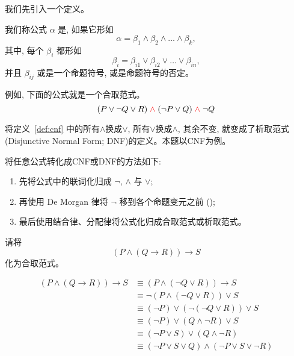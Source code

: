 \documentclass[a4paper, justified]{tufte-handout}
\begin{document}
\begin{problem}
  我们先引入一个定义。

  \begin{definition}
    \label{def:cnf}
    我们称公式 $\alpha$ 是, 如果它形如
    \[
      \alpha = \beta_{1} \land \beta_{2} \land \dots \land \beta_{k},
    \]
    其中, 每个 $\beta_{i}$ 都形如
    \[
      \beta_{i} = \beta_{i1} \lor \beta_{i2} \lor \dots \lor \beta_{in},
    \]
    并且 $\beta_{ij}$ 或是一个命题符号, 或是命题符号的否定。
  \end{definition}

  例如, 下面的公式就是一个合取范式。
  \[
    (P \lor \lnot Q \lor R) \;\textcolor{red}{\land}\; (\lnot P \lor Q) \;\textcolor{red}{\land}\; \lnot Q
  \]

  将定义~\ref{def:cnf} 中的所有$\land$换成$\lor$, 所有$\lor$换成$\land$, 其余不变,
  就变成了析取范式 (Disjunctive Normal Form; DNF)的定义。本题以CNF为例。

  将任意公式转化成CNF或DNF的方法如下:
  \begin{enumerate}[(1)]
    \item 先将公式中的联词化归成 $\lnot$, $\land$ 与 $\lor$;
    \item 再使用 De Morgan 律将 $\lnot$ 移到各个命题变元之前 ();
    \item 最后使用结合律、分配律将公式化归成合取范式或析取范式。
  \end{enumerate}

  请将
  \[
    (P \land (Q \to R)) \to S
  \]
  化为合取范式。
\end{problem}

\begin{solution}
  \begin{align*}
    (P \land (Q \to R)) \to S
    &\equiv (P \land (\lnot Q \lor R)) \to S \\
    &\equiv \lnot (P \land (\lnot Q \lor R)) \lor S \\
    &\equiv (\lnot P) \lor (\lnot (\lnot Q \lor R)) \lor S \\
    &\equiv (\lnot P) \lor (Q \land \lnot R) \lor S \\
    &\equiv (\lnot P \lor S) \lor (Q \land \lnot R) \\
    &\equiv (\lnot P \lor S \lor Q) \land (\lnot P \lor S \lor \lnot R)
  \end{align*}
\end{solution}
\end{document}
